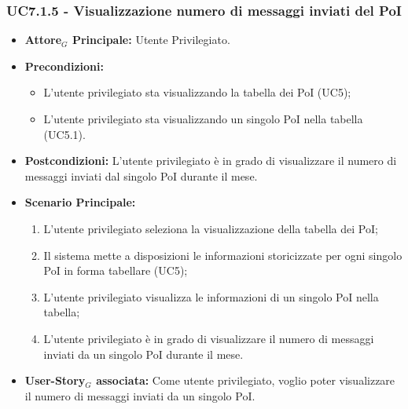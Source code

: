 \documentclass[11pt]{article}
\begin{document}
\begin{justify}
\subsubsection{\textbf{UC7.1.5 - Visualizzazione numero di messaggi inviati del PoI}}
\label{UC7.1.5}
\begin{itemize}
    \item \textbf{Attore$_G$ Principale:} Utente Privilegiato.
    \item \textbf{Precondizioni:} 
        \begin{itemize}
          \item L'utente privilegiato sta visualizzando la tabella dei PoI (UC5);
            \item L'utente privilegiato sta visualizzando un singolo PoI nella tabella (UC5.1).
        \end{itemize}
      \item \textbf{Postcondizioni:} L'utente privilegiato è in grado di visualizzare il numero di messaggi inviati dal singolo PoI durante il mese.\\
    \item \textbf{Scenario Principale:} 
        \begin{enumerate}
        \item L'utente privilegiato seleziona la visualizzazione della tabella dei PoI;
          \item Il sistema mette a disposizioni le informazioni storicizzate per ogni singolo PoI in forma tabellare (UC5);
          \item L'utente privilegiato visualizza le informazioni di un singolo PoI nella tabella;
            \item L'utente privilegiato è in grado di visualizzare il numero di messaggi inviati da un singolo PoI durante il mese.
        \end{enumerate}
    \item \textbf{User-Story$_G$ associata:} Come utente privilegiato, voglio poter visualizzare il numero di messaggi inviati da un singolo PoI.
\end{itemize}


\end{justify}
\end{document}
